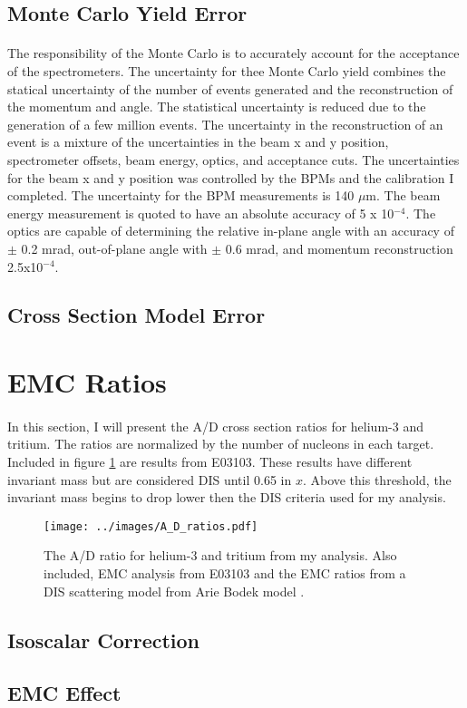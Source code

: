 \subsection{Monte Carlo Yield Error}
\paragraph{}The responsibility of the Monte Carlo is to accurately account for the acceptance of the spectrometers. The uncertainty for thee Monte Carlo yield combines the statical uncertainty of the number of events generated and the reconstruction of the momentum and angle.  The statistical uncertainty is reduced due to the generation of a few million events. The uncertainty in the reconstruction of an event is a mixture of the uncertainties in the beam x and y position, spectrometer offsets, beam energy, optics, and acceptance cuts. The uncertainties for the beam x and y position was controlled by the BPMs and the calibration I completed. The uncertainty for the BPM measurements is 140 $\mu$m. The beam energy measurement is quoted to have an absolute accuracy of 5 x 10$^{-4}$.  The optics are capable of determining the relative in-plane angle with an accuracy of $\pm$ 0.2 mrad, out-of-plane angle with $\pm$ 0.6 mrad, and momentum reconstruction 2.5x10$^{-4}$\cite{HallA}. 

\cite{Ar_Ti}
\subsection{Cross Section Model Error}


\section{EMC Ratios}
\paragraph{}In this section, I will present the A/D cross section ratios for helium-3 and tritium. The ratios are normalized by the number of nucleons in each target. Included in figure \ref{ADplot} are results from E03103. These results have different invariant mass but are considered DIS until 0.65 in $x$. Above this threshold, the invariant mass begins to drop lower then the DIS criteria used for my analysis. 
\begin{figure}
	\centering
	\texttt{[image: ../images/A\_D\_ratios.pdf]}
	\caption{The A/D ratio for helium-3 and tritium from my analysis. Also included, EMC analysis from E03103\cite{seeley} and the EMC ratios from a DIS scattering model from Arie Bodek model \cite{DISmodel}.}
	\label{ADplot}
\end{figure}





\subsection{Isoscalar Correction}
\subsection{EMC Effect}

